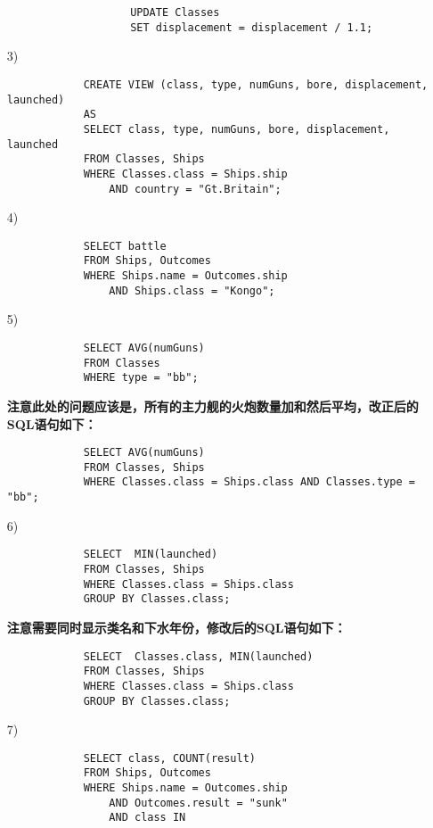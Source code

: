 \documentclass[10pt,a4paper]{article}
\begin{document}
\begin{enumerate}
\begin{itemize}
\begin{verbatim}
                UPDATE Classes
                SET displacement = displacement / 1.1;
            \end{verbatim}  
        \end{itemize}
        \item[3)]\begin{verbatim}
            CREATE VIEW (class, type, numGuns, bore, displacement, launched)
            AS
            SELECT class, type, numGuns, bore, displacement, launched
            FROM Classes, Ships
            WHERE Classes.class = Ships.ship
                AND country = "Gt.Britain";
        \end{verbatim}
        \item[4)]\begin{verbatim}
            SELECT battle
            FROM Ships, Outcomes
            WHERE Ships.name = Outcomes.ship
                AND Ships.class = "Kongo";
        \end{verbatim}
        \item[5)]\begin{verbatim}
            SELECT AVG(numGuns)
            FROM Classes
            WHERE type = "bb";
        \end{verbatim}
        \textbf{注意此处的问题应该是，所有的主力舰的火炮数量加和然后平均，改正后的SQL语句如下：}
        \begin{verbatim}
            SELECT AVG(numGuns)
            FROM Classes, Ships
            WHERE Classes.class = Ships.class AND Classes.type = "bb";
        \end{verbatim}
        \item[6)]\begin{verbatim}
            SELECT  MIN(launched)
            FROM Classes, Ships
            WHERE Classes.class = Ships.class
            GROUP BY Classes.class;
        \end{verbatim}
        \textbf{注意需要同时显示类名和下水年份，修改后的SQL语句如下：}
        \begin{verbatim}
            SELECT  Classes.class, MIN(launched)
            FROM Classes, Ships
            WHERE Classes.class = Ships.class
            GROUP BY Classes.class;
        \end{verbatim}
        \item[7)]\begin{verbatim}
            SELECT class, COUNT(result)
            FROM Ships, Outcomes
            WHERE Ships.name = Outcomes.ship
                AND Outcomes.result = "sunk"
                AND class IN

\end{verbatim}
\end{enumerate}
\end{document}

